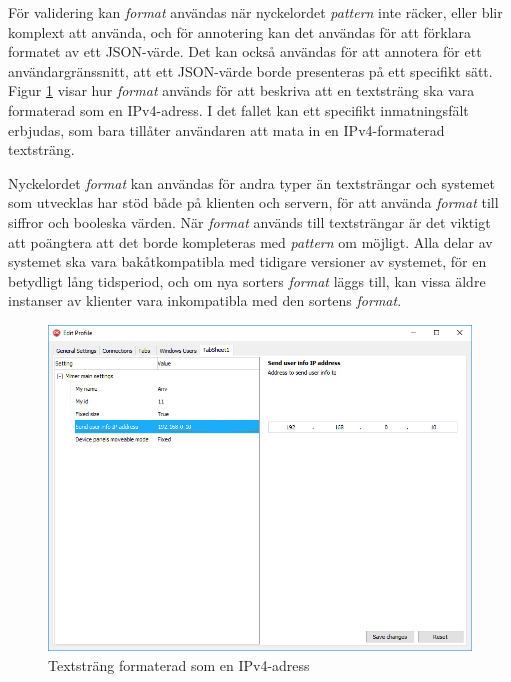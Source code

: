 För validering kan \textit{format} användas när nyckelordet \textit{pattern} inte räcker, eller blir komplext att använda, och för annotering kan det användas för att förklara formatet av ett JSON-värde. Det kan också användas för att annotera för ett användargränssnitt, att ett JSON-värde borde presenteras på ett specifikt sätt. Figur \ref{fig:textstrang-ip-format} visar hur \textit{format} används för att beskriva att en textsträng ska vara formaterad som en IPv4-adress. I det fallet kan ett specifikt inmatningsfält erbjudas, som bara tillåter användaren att mata in en IPv4-formaterad textsträng.

Nyckelordet \textit{format} kan användas för andra typer än textsträngar och systemet som utvecklas har stöd både på klienten och servern, för att använda \textit{format} till siffror och booleska värden. När \textit{format} används till textsträngar är det viktigt att poängtera att det borde kompleteras med \textit{pattern} om möjligt. Alla delar av systemet ska vara bakåtkompatibla med tidigare versioner av systemet, för en betydligt lång tidsperiod, och om nya sorters \textit{format} läggs till, kan vissa äldre instanser av klienter vara inkompatibla med den sortens \textit{format}.

\begin{figure}
	\includegraphics[width=\textwidth]{./images/gui/textstrang-ip.png}
	\vspace{-1.7em}
	\caption{Textsträng formaterad som en IPv4-adress}
	\label{fig:textstrang-ip-format}
\end{figure}


\FloatBarrier
